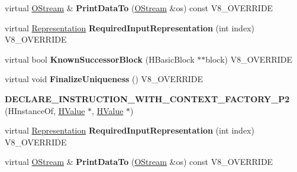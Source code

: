 \begin{DoxyCompactItemize}
\item 
\hypertarget{classv8_1_1internal_1_1_v8___f_i_n_a_l_ac450dad970b14246be761ccf5004924b}{}virtual \hyperlink{classv8_1_1internal_1_1_o_stream}{O\+Stream} \& {\bfseries Print\+Data\+To} (\hyperlink{classv8_1_1internal_1_1_o_stream}{O\+Stream} \&os) const V8\+\_\+\+O\+V\+E\+R\+R\+I\+D\+E\label{classv8_1_1internal_1_1_v8___f_i_n_a_l_ac450dad970b14246be761ccf5004924b}

\item 
\hypertarget{classv8_1_1internal_1_1_v8___f_i_n_a_l_a6c6d1f37f40b113d8f4062f1ffff7215}{}virtual \hyperlink{classv8_1_1internal_1_1_representation}{Representation} {\bfseries Required\+Input\+Representation} (int index) V8\+\_\+\+O\+V\+E\+R\+R\+I\+D\+E\label{classv8_1_1internal_1_1_v8___f_i_n_a_l_a6c6d1f37f40b113d8f4062f1ffff7215}

\item 
\hypertarget{classv8_1_1internal_1_1_v8___f_i_n_a_l_a85ba341b22db01ee3cd7145d9f8e9b99}{}virtual bool {\bfseries Known\+Successor\+Block} (H\+Basic\+Block $\ast$$\ast$block) V8\+\_\+\+O\+V\+E\+R\+R\+I\+D\+E\label{classv8_1_1internal_1_1_v8___f_i_n_a_l_a85ba341b22db01ee3cd7145d9f8e9b99}

\item 
\hypertarget{classv8_1_1internal_1_1_v8___f_i_n_a_l_a935c3ddc60915dd102968e2b529aa1fc}{}virtual void {\bfseries Finalize\+Uniqueness} () V8\+\_\+\+O\+V\+E\+R\+R\+I\+D\+E\label{classv8_1_1internal_1_1_v8___f_i_n_a_l_a935c3ddc60915dd102968e2b529aa1fc}

\item 
\hypertarget{classv8_1_1internal_1_1_v8___f_i_n_a_l_a9c355ad23605ea1c57acb08af2e6d20d}{}{\bfseries D\+E\+C\+L\+A\+R\+E\+\_\+\+I\+N\+S\+T\+R\+U\+C\+T\+I\+O\+N\+\_\+\+W\+I\+T\+H\+\_\+\+C\+O\+N\+T\+E\+X\+T\+\_\+\+F\+A\+C\+T\+O\+R\+Y\+\_\+\+P2} (H\+Instance\+Of, \hyperlink{classv8_1_1internal_1_1_h_value}{H\+Value} $\ast$, \hyperlink{classv8_1_1internal_1_1_h_value}{H\+Value} $\ast$)\label{classv8_1_1internal_1_1_v8___f_i_n_a_l_a9c355ad23605ea1c57acb08af2e6d20d}

\item 
\hypertarget{classv8_1_1internal_1_1_v8___f_i_n_a_l_a6c6d1f37f40b113d8f4062f1ffff7215}{}virtual \hyperlink{classv8_1_1internal_1_1_representation}{Representation} {\bfseries Required\+Input\+Representation} (int index) V8\+\_\+\+O\+V\+E\+R\+R\+I\+D\+E\label{classv8_1_1internal_1_1_v8___f_i_n_a_l_a6c6d1f37f40b113d8f4062f1ffff7215}

\item 
\hypertarget{classv8_1_1internal_1_1_v8___f_i_n_a_l_ac450dad970b14246be761ccf5004924b}{}virtual \hyperlink{classv8_1_1internal_1_1_o_stream}{O\+Stream} \& {\bfseries Print\+Data\+To} (\hyperlink{classv8_1_1internal_1_1_o_stream}{O\+Stream} \&os) const V8\+\_\+\+O\+V\+E\+R\+R\+I\+D\+E\label{classv8_1_1internal_1_1_v8___f_i_n_a_l_ac450dad970b14246be761ccf5004924b}


\end{DoxyCompactItemize}
